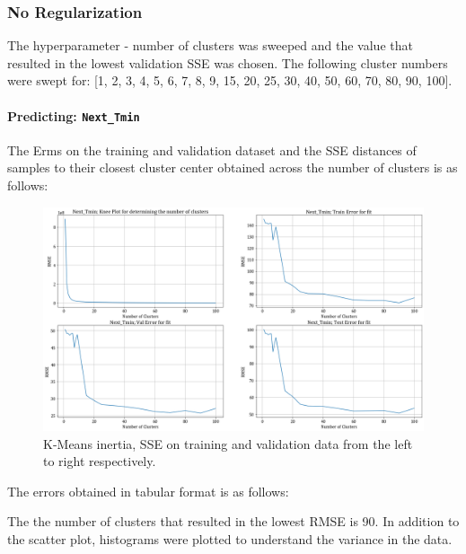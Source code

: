 \documentclass[12pt,a4paper]{article}
\newcommand{\noi}{\noindent}
\def\tt#1{\texttt{#1}}
\begin{document}
\subsubsection{No Regularization}
The hyperparameter - number of clusters was sweeped and the value that resulted in the lowest validation SSE was chosen. The following cluster numbers were swept for: [1, 2, 3, 4, 5, 6, 7, 8, 9, 15, 20, 25, 30, 40, 50, 60, 70, 80, 90, 100].

\paragraph{Predicting: \tt{Next\_Tmin}}
The Erms on the training and validation dataset and the SSE distances of samples to their closest cluster center obtained across the number of clusters is as follows:
\begin{figure}[H]
     \centering
     \includegraphics[scale=0.4]{images/t3_d3/no_reg/tmin_errors.png}
     \caption{K-Means inertia, SSE on training and validation data from the left to right respectively.}
\end{figure}

\vspace{-1em}
The errors obtained in tabular format is as follows:


\noi
The the number of clusters that resulted in the lowest RMSE is 90. In addition to the scatter plot, histograms were plotted to understand the variance in the data.\\
\end{document}
